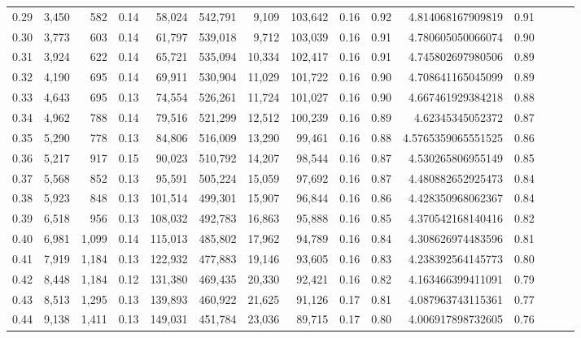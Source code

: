 \begin{tabular}{rrrrrrrrrrrrrrr}
0.29 &   3,450 &    582 &  0.14 &   58,024 &  542,791 &    9,109 &  103,642 &  0.16 &  0.92 &     4.814068167909819 &      0.91 \\
0.30 &   3,773 &    603 &  0.14 &   61,797 &  539,018 &    9,712 &  103,039 &  0.16 &  0.91 &     4.780605050066074 &      0.90 \\
0.31 &   3,924 &    622 &  0.14 &   65,721 &  535,094 &   10,334 &  102,417 &  0.16 &  0.91 &     4.745802697980506 &      0.89 \\
0.32 &   4,190 &    695 &  0.14 &   69,911 &  530,904 &   11,029 &  101,722 &  0.16 &  0.90 &     4.708641165045099 &      0.89 \\
0.33 &   4,643 &    695 &  0.13 &   74,554 &  526,261 &   11,724 &  101,027 &  0.16 &  0.90 &     4.667461929384218 &      0.88 \\
0.34 &   4,962 &    788 &  0.14 &   79,516 &  521,299 &   12,512 &  100,239 &  0.16 &  0.89 &      4.62345345052372 &      0.87 \\
0.35 &   5,290 &    778 &  0.13 &   84,806 &  516,009 &   13,290 &   99,461 &  0.16 &  0.88 &    4.5765359065551525 &      0.86 \\
0.36 &   5,217 &    917 &  0.15 &   90,023 &  510,792 &   14,207 &   98,544 &  0.16 &  0.87 &     4.530265806955149 &      0.85 \\
0.37 &   5,568 &    852 &  0.13 &   95,591 &  505,224 &   15,059 &   97,692 &  0.16 &  0.87 &     4.480882652925473 &      0.84 \\
0.38 &   5,923 &    848 &  0.13 &  101,514 &  499,301 &   15,907 &   96,844 &  0.16 &  0.86 &     4.428350968062367 &      0.84 \\
0.39 &   6,518 &    956 &  0.13 &  108,032 &  492,783 &   16,863 &   95,888 &  0.16 &  0.85 &     4.370542168140416 &      0.82 \\
0.40 &   6,981 &  1,099 &  0.14 &  115,013 &  485,802 &   17,962 &   94,789 &  0.16 &  0.84 &     4.308626974483596 &      0.81 \\
0.41 &   7,919 &  1,184 &  0.13 &  122,932 &  477,883 &   19,146 &   93,605 &  0.16 &  0.83 &     4.238392564145773 &      0.80 \\
0.42 &   8,448 &  1,184 &  0.12 &  131,380 &  469,435 &   20,330 &   92,421 &  0.16 &  0.82 &     4.163466399411091 &      0.79 \\
0.43 &   8,513 &  1,295 &  0.13 &  139,893 &  460,922 &   21,625 &   91,126 &  0.17 &  0.81 &     4.087963743115361 &      0.77 \\
0.44 &   9,138 &  1,411 &  0.13 &  149,031 &  451,784 &   23,036 &   89,715 &  0.17 &  0.80 &     4.006917898732605 &      0.76 \\

\end{tabular}

